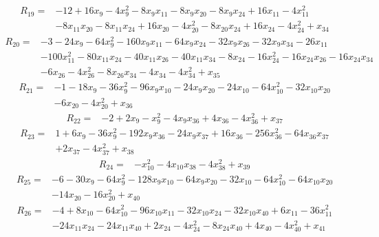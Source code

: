 \[
\begin{aligned}
R_{19}={}&-12+16x_{9}-4x_{9}^{2}-8x_{9}x_{11}-8x_{9}x_{20}-8x_{9}x_{24}+16x_{11}-4x_{11}^{2}\\
&-8x_{11}x_{20}-8x_{11}x_{24}+16x_{20}-4x_{20}^{2}-8x_{20}x_{24}+16x_{24}-4x_{24}^{2}+x_{34}
\end{aligned}
\]
\[
\begin{aligned}
R_{20}={}&-3-24x_{9}-64x_{9}^{2}-160x_{9}x_{11}-64x_{9}x_{24}-32x_{9}x_{26}-32x_{9}x_{34}-26x_{11}\\
&-100x_{11}^{2}-80x_{11}x_{24}-40x_{11}x_{26}-40x_{11}x_{34}-8x_{24}-16x_{24}^{2}-16x_{24}x_{26}-16x_{24}x_{34}\\
&-6x_{26}-4x_{26}^{2}-8x_{26}x_{34}-4x_{34}-4x_{34}^{2}+x_{35}
\end{aligned}
\]
\[
\begin{aligned}
R_{21}={}&-1-18x_{9}-36x_{9}^{2}-96x_{9}x_{10}-24x_{9}x_{20}-24x_{10}-64x_{10}^{2}-32x_{10}x_{20}\\
&-6x_{20}-4x_{20}^{2}+x_{36}
\end{aligned}
\]
\[
\begin{aligned}
R_{22}={}&-2+2x_{9}-x_{9}^{2}-4x_{9}x_{36}+4x_{36}-4x_{36}^{2}+x_{37}
\end{aligned}
\]
\[
\begin{aligned}
R_{23}={}&1+6x_{9}-36x_{9}^{2}-192x_{9}x_{36}-24x_{9}x_{37}+16x_{36}-256x_{36}^{2}-64x_{36}x_{37}\\
&+2x_{37}-4x_{37}^{2}+x_{38}
\end{aligned}
\]
\[
\begin{aligned}
R_{24}={}&-x_{10}^{2}-4x_{10}x_{38}-4x_{38}^{2}+x_{39}
\end{aligned}
\]
\[
\begin{aligned}
R_{25}={}&-6-30x_{9}-64x_{9}^{2}-128x_{9}x_{10}-64x_{9}x_{20}-32x_{10}-64x_{10}^{2}-64x_{10}x_{20}\\
&-14x_{20}-16x_{20}^{2}+x_{40}
\end{aligned}
\]
\[
\begin{aligned}
R_{26}={}&-4+8x_{10}-64x_{10}^{2}-96x_{10}x_{11}-32x_{10}x_{24}-32x_{10}x_{40}+6x_{11}-36x_{11}^{2}\\
&-24x_{11}x_{24}-24x_{11}x_{40}+2x_{24}-4x_{24}^{2}-8x_{24}x_{40}+4x_{40}-4x_{40}^{2}+x_{41}
\end{aligned}
\]
